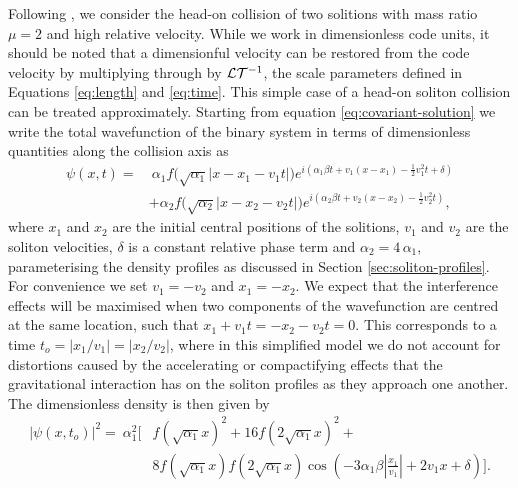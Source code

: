 \documentclass[a4paper,11pt]{article}
\begin{document}
Following \cite{Schwabe2016}, we consider the head-on collision of two solitions with mass ratio $\mu=2$ and high relative velocity. While we work in dimensionless code units, it should be noted that a dimensionful velocity can be restored from the code velocity by multiplying through by $\CMcal{L}\CMcal{T}^{-1}$, the scale parameters defined in Equations \ref{eq:length} and \ref{eq:time}. This simple case of a head-on soliton collision can be treated approximately. Starting from equation \ref{eq:covariant-solution} we write the total wavefunction of the binary system in terms of dimensionless quantities along the collision axis as
\begin{align}
    \psi(x,t)=& \ \alpha_1 f\big(\sqrt{\alpha_1}\vert x-x_1-v_1 t\vert\big)e^{i\left(\alpha_1\beta t+v_1(x-x_1)-\frac{1}{2}v_1^2 t+\delta\right)}\nonumber\\
    &+\alpha_2 f\big(\sqrt{\alpha_2}\vert x-x_2-v_2 t\vert\big)e^{i\left(\alpha_2\beta t+v_2(x-x_2)-\frac{1}{2}v_2^2 t\right)},
\end{align}
where $x_1$ and $x_2$ are the initial central positions of the solitions, $v_1$ and $v_2$ are the soliton velocities, $\delta$ is a constant relative phase term and $\alpha_2 = 4\, \alpha_1$, parameterising the density profiles as discussed in Section \ref{sec:soliton-profiles}. For convenience we set $v_1=-v_2$ and $x_1=-x_2$. We expect that the interference effects will be maximised when two components of the wavefunction are centred at the same location, such that $x_1+v_1t=-x_2-v_2t=0$. This corresponds to a time $t_{o}=\vert x_1/v_1\vert = \vert x_2/v_2\vert$, where in this simplified model we do not account for distortions caused by the accelerating or compactifying effects that the gravitational interaction has on the soliton profiles as they approach one another. The dimensionless density is then given by
\begin{align}\label{eq:predicted-interference}
    \vert\psi(x,t_{o})\vert^2= \ \alpha_1^2\bigg[&f(\sqrt{\alpha_1}x)^2+16f(2\sqrt{\alpha_1}x)^2+\nonumber\\
    &8f(\sqrt{\alpha_1}x)f(2\sqrt{\alpha_1}x)\operatorname{cos}\left(-3\alpha_1\beta\left\vert\frac{x_1}{v_1}\right\vert+2v_1x+\delta \right)\bigg].
\end{align}
\end{document}

